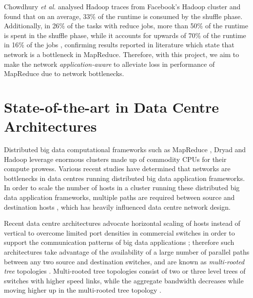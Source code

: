Chowdhury \textit{et al.} \cite{chowdhury2011managing} analysed Hadoop traces from Facebook's Hadoop cluster and found that on an average, 33\% of the runtime is consumed by the shuffle phase. Additionally, in 26\% of the tasks with reduce jobs, more than 50\% of the runtime is spent in the shuffle phase, while it accounts for upwards of 70\% of the runtime in 16\% of the jobs \cite{chowdhury2011managing}, confirming results reported in literature \cite{al2010hedera, greenberg2009vl2,guo2008dcell} which state that network is a bottleneck in MapReduce. Therefore, with this project, we aim to make the network \textit{application-aware} to alleviate loss in performance of MapReduce due to network bottlenecks.

\section{State-of-the-art in Data Centre Architectures} \label{sec: DataCentreArch}

Distributed big data computational frameworks such as MapReduce \cite{dean2008mapreduce}, Dryad \cite{isard2007dryad} and Hadoop \cite{HadoopWeb} leverage enormous clusters made up of commodity CPUs for their compute prowess. Various recent studies  \cite{benson2010understanding, chang2008bigtable, decandia2007dynamo, ghemawat2003google, greenberg2009vl2} have determined that networks are bottlenecks in data centres running distributed big data application frameworks. In order to scale the number of hosts in a cluster running these distributed big data application frameworks,  multiple paths are required between source and destination hosts  \cite{al2008scalable,greenberg2009vl2, greenberg2008towards, guo2008dcell,guo2009bcube}, which has heavily influenced data centre network design. 

Recent data centre architectures advocate horizontal scaling of hosts instead of vertical to overcome limited port densities in commercial switches in order to support the communication patterns of big data applications \cite{al2008scalable,greenberg2009vl2, greenberg2008towards}; therefore such architectures take advantage of the availability of a large number of parallel paths between any two source and destination switches, and are known as \textit{multi-rooted tree} topologies \cite{al2010hedera}. Multi-rooted tree topologies consist of two or three level trees of switches \cite{al2008scalable, al2010hedera} with higher speed links, while the aggregate bandwidth decreases while moving higher up in the multi-rooted tree topology \cite{headquarters2007cisco}.  

